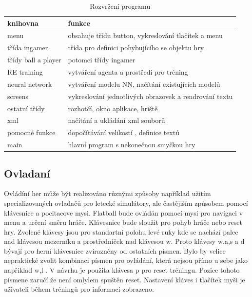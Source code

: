 \documentclass[
  program=ainfk,
  biblatex,
  language=czech,
  figures=true,
  tables ,
  sourcecodes=true,
  glossaries=true,
  index
]{kidiplom}
\begin{document}
 \begin{center}
\begin{table}[h]

		\caption{Rozvržení programu}\label{tab:tab1} 
\begin{tabular}{ |p{3.5cm}|p{10cm} |} 
 		\hline
		 knihovna &  funkce   \\
		 \hline
		menu &obsahuje třídu button, vykreslování tlačítek a menu \\
		třída ingamer & třída pro definici pohybujícího se objektu hry \\
		třídy ball a player &potomci třídy ingamer\\
		RE training & vytváření agenta a prostředí pro tréning  \\
		neural network &  vytváření modelu NN, načítání existujících modelů \\
		screens & vykreslování jednotlivých obrazovek a rendrování textu \\
		ostatní třídy & rozhotčí, okno aplikace, hriště \\
		xml  & načítání a ukládání xml souborů\\
		pomocné funkce& dopočítávání velikostí , definice textů \\
		main & hlavní program s nekonečnou smyčkou hry     \\
		\hline
\end{tabular}
\end{table}
\end{center}



\subsection{Ovladaní} 
 Ovládíní her může být realizováno různými způsoby například užitím specializovaných ovladačů pro letecké simulátory, ale častějiším způsobem pomocí klávesnice a pocitacove mysi. Flatball bude ovládán pomocí mysi pro navigaci v menu a určení směru hráče. Klávesnice bude sloužit pro pohyb hráče nebo reset hry. Zvolené klávesy jsou pro standartní polohu levé ruky kde se nachází palec nad klávesou mezerníku a prostředníček nad klávesou w. Proto klávesy w,a,s a d bývají pro herní klávesnice zvírazněny od ostatních písmen. Bylo by velice nepraktické zvolit kombinaci písmen pro ovládání, která nejsou přímo u sebe jako například w,l . V návrhu je použita klávesa p pro reset tréningu. Pozice tohoto písmene zaručí že není omlylem spuštěn reset. Nastavení kláves i tlačítek myši je uživateli během tréningů pro informaci zobrazeno.  
\end{document}
